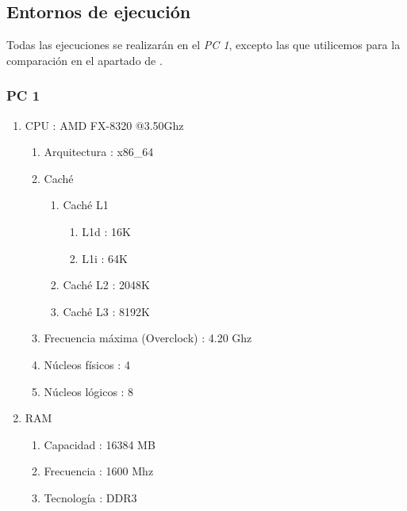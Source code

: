 \documentclass[12pt,spanish]{article}
\begin{document}
\subsection{Entornos de ejecución}
\label{sec:entorno}
Todas las ejecuciones se realizarán en el \emph{PC 1}, excepto las que utilicemos para la comparación en el apartado de \textit{}.
\subsubsection{PC 1}
\label{sec:pc1}
\begin{enumerate}
 \item CPU : AMD FX-8320 @3.50Ghz
  \begin{enumerate}
    \item Arquitectura : x86\_64
 	\item Caché
 	\begin{enumerate}
 		 \item Caché L1
 		\begin{enumerate}
 			 \item L1d : 16K
			 \item L1i : 64K 
 		 \end{enumerate}
		 \item Caché L2 : 2048K
 		 \item Caché L3 : 8192K
 	\end{enumerate}
 	 \item Frecuencia máxima (Overclock) : 4.20 Ghz
	 \item Núcleos físicos : 4
	 \item Núcleos lógicos : 8
	\end{enumerate}
	\item RAM
	\begin{enumerate}
	\item Capacidad : 16384 MB
	\item Frecuencia : 1600 Mhz
 	\item Tecnología : DDR3
	\end{enumerate}
\end{enumerate}
\newpage
\end{document}
